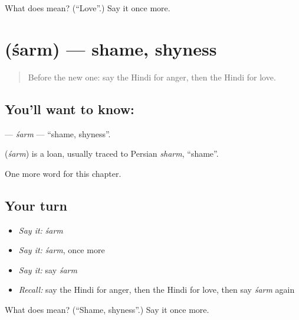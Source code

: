 \begin{tcolorbox}[breakable,colback=teal!4,colframe=teal!35!black,title={Before you move on}]
What does  mean? (\textquotedblleft{}Love\textquotedblright{}.) Say it once more.
\end{tcolorbox}
\section[\texorpdfstring{\hi{शर्म} (śarm)}{शर्म (śarm)}]{ (śarm) — shame, shyness}

\label{lesson:HI-C186-sarm}



\begin{quote}
Before the new one: say the Hindi for anger, then the Hindi for love.
\end{quote}

\subsection*{You'll want to know: }
\textbf{} — \emph{śarm} — \textquotedblleft{}shame, shyness\textquotedblright{}.

\begin{cousinweb}
\textbf{} (\emph{śarm}) is a loan, usually traced to Persian \emph{sharm}, \textquotedblleft{}shame\textquotedblright{}.
\end{cousinweb}

\begin{grammarlens}[title={What you've built}]
One more word for this chapter.
\end{grammarlens}

\subsection*{Your turn}
\begin{itemize}
\raggedright
  \item \emph{Say it:} \emph{śarm}
  \item \emph{Say it:} \emph{śarm}, once more
  \item \emph{Say it:} say \emph{śarm}
  \item \emph{Recall:} say the Hindi for anger, then the Hindi for love, then say \emph{śarm} again
\end{itemize}

\begin{tcolorbox}[breakable,colback=teal!4,colframe=teal!35!black,title={Before you move on}]
What does  mean? (\textquotedblleft{}Shame, shyness\textquotedblright{}.) Say it once more.
\end{tcolorbox}
